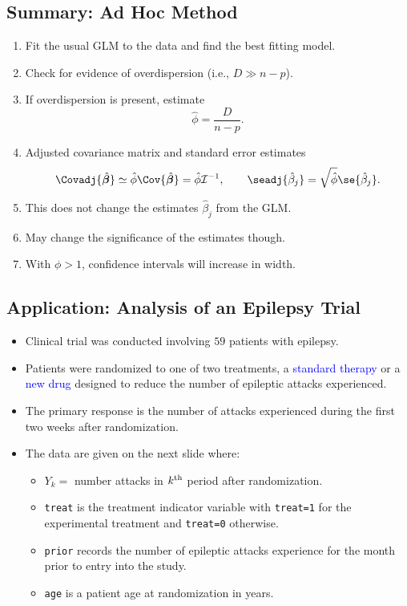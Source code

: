 \documentclass{article}\usepackage[]{graphicx}\usepackage[svgnames]{xcolor}
\providecommand{\Vector}[1]{\bm{#1}}%
\begin{document}
\subsection*{Summary: Ad Hoc Method}
\begin{enumerate}[1.]
      \item Fit the usual GLM to the data and find the best fitting model.
      \item Check for evidence of overdispersion (i.e., $ D\gg n-p $).
      \item If overdispersion is present, estimate
            \[ \hat{\phi}=\frac{D}{n-p}. \]
      \item Adjusted covariance matrix and standard error estimates
            \[ \Covadj{\hat{\Vector{\beta}}}\simeq \hat{\phi}\Cov{\hat{\Vector{\beta}}}=\hat{\phi}\mathcal{I}^{-1},
                  \qquad \seadj{\hat{\beta}_j}=\sqrt{\hat{\phi}}\se{\hat{\beta}_j}. \]
      \item This does not change the estimates $ \hat{\beta}_j $ from the GLM.
      \item May change the significance of the estimates though.
      \item With $ \phi>1 $, confidence intervals will increase in width.
\end{enumerate}
\subsection*{Application: Analysis of an Epilepsy Trial}
\begin{itemize}
      \item Clinical trial was conducted involving $59$ patients with epilepsy.
      \item Patients were randomized to one of two treatments, a \textcolor{Blue}{standard therapy} or a \textcolor{Blue}{new drug}
            designed to reduce the number of epileptic attacks experienced.
      \item The primary response is the number of attacks experienced during the first two
            weeks after randomization.
      \item The data are given on the next slide where:
            \begin{itemize}
                  \item $ Y_k= $ number attacks in $ k\textsuperscript{th} $ period after randomization.
                  \item \texttt{treat} is the treatment indicator variable with \texttt{treat=1} for the experimental treatment
                        and \texttt{treat=0} otherwise.
                  \item \texttt{prior} records the number of epileptic attacks experience for the month prior to entry into the study.
                  \item \texttt{age} is a patient age at randomization in years.
            \end{itemize}
\end{itemize}
\end{document}
